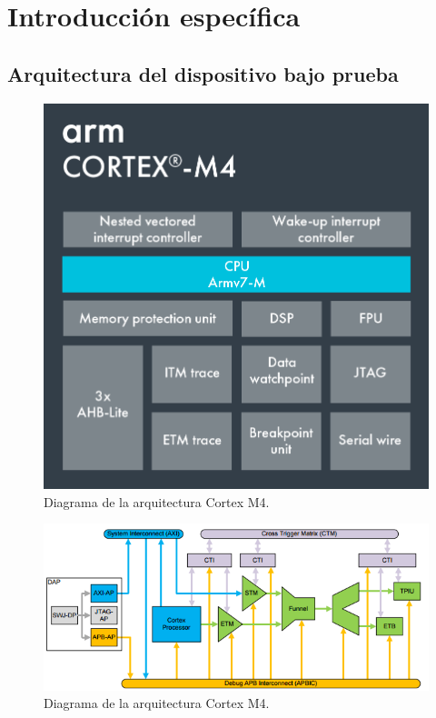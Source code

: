 \chapter{Introducción específica} %

\label{Chapter2}

\section{Arquitectura del dispositivo bajo prueba}
\label{sec:dut}

\begin{figure}[htbp]
	\centering
	\includegraphics[width=.8\textwidth]{./Figures/Cortex-M4.png}
    \caption{Diagrama de la arquitectura Cortex M4\citep{WEBSITE:cortexm}.}
	\label{fig:cortexm}
\end{figure}

\begin{figure}[htbp]
	\centering
	\includegraphics[width=\textwidth]{./Figures/coresight.png}
    \caption{Diagrama de la arquitectura Cortex M4\citep{WEBSITE:coresight}.}
	\label{fig:coresight}
\end{figure}

